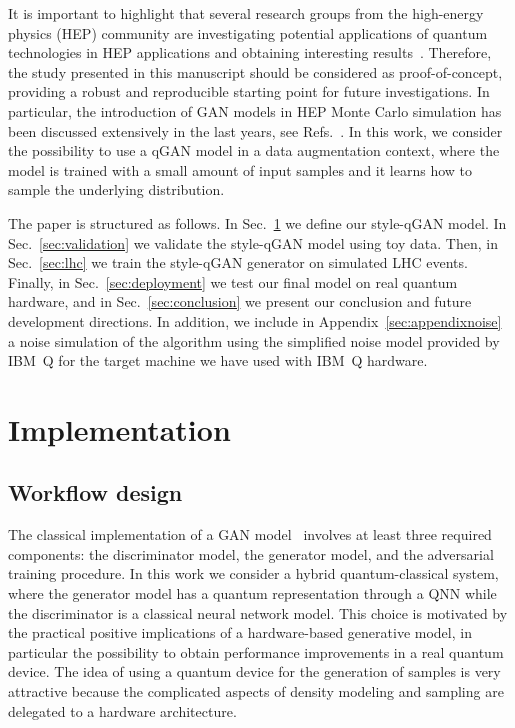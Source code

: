 \documentclass[twocolumn,preprintnumbers,superscriptaddress]{revtex4-2}
\begin{document}
It is important to highlight that several research groups from the high-energy
physics (HEP) community are investigating potential applications of quantum
technologies in HEP applications and obtaining interesting
results~\cite{P_rez_Salinas_2021,Guan_2021,chang2021quantum,Chang_2021,Belis_2021,khattak2021fast}.
Therefore, the study presented in this manuscript should be considered as
proof-of-concept, providing a robust and reproducible starting point for future
investigations. In particular, the introduction of GAN models in HEP Monte Carlo
simulation has been discussed extensively in the last years, see
Refs.~\cite{baldi2021gan,Backes_2021,butter2020generative,Butter_2021,Butter_2020,Bellagente_2020,Butter_2019}.
In this work, we consider the possibility to use a qGAN model in a data
augmentation context, where the model is trained with a small amount of input
samples and it learns how to sample the underlying distribution.

The paper is structured as follows. In Sec.~\ref{sec:implementation} we define our style-qGAN model. In Sec.~\ref{sec:validation} we
validate the style-qGAN model using toy data. Then, in Sec.~\ref{sec:lhc} we train the style-qGAN
generator on simulated LHC events. Finally, in Sec.~\ref{sec:deployment} we test
our final model on real quantum hardware, and in Sec.~\ref{sec:conclusion} we
present our conclusion and future development directions. In addition, we include in Appendix~\ref{sec:appendixnoise} a noise simulation of the algorithm using the simplified noise model provided by IBM~Q for the target machine we have used with IBM~Q hardware.

\section{Implementation}
\label{sec:implementation}

\subsection{Workflow design}

The classical implementation of a GAN model~\cite{goodfellow2014generative}
involves at least three required components: the discriminator model, the
generator model, and the adversarial training procedure. In this work we
consider a hybrid quantum-classical system, where the generator model has a
quantum representation through a QNN while the
discriminator is a classical neural network model. This choice is motivated by
the practical positive implications of a hardware-based generative model, in
particular the possibility to obtain performance improvements in a real quantum
device. The idea of using a quantum device for the generation of
samples is very attractive because the complicated aspects of density modeling and sampling are delegated to a hardware architecture.
\end{document}
